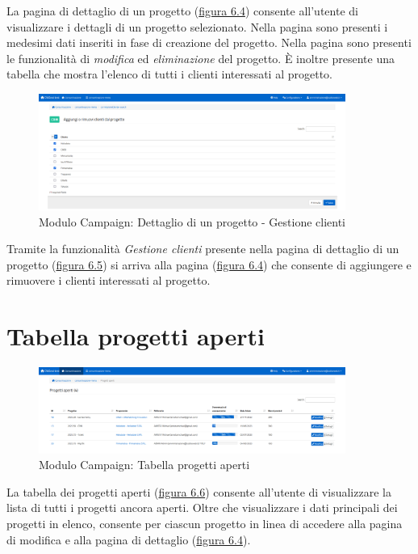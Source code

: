 \noindent La pagina di dettaglio di un progetto ({\hyperref[fig:dettaglioProgetto]{figura 6.4}}) consente all'utente di visualizzare i dettagli di un progetto selezionato. Nella pagina sono presenti i medesimi dati inseriti in fase di creazione del progetto. Nella pagina sono presenti le funzionalità di \textit{modifica} ed \textit{eliminazione} del progetto. È inoltre presente una tabella che mostra l'elenco di tutti i clienti interessati al progetto. 

\begin{figure}[!h]
\centering
\includegraphics[width=380px]{../images/UI/06-aggiungiRimuoviClienti.png}
\caption{Modulo Campaign: Dettaglio di un progetto - Gestione clienti}
\label{fig:gestioneClienti}
\end{figure}

\noindent Tramite la funzionalità \textit{Gestione clienti} presente nella pagina di dettaglio di un progetto ({\hyperref[fig:gestioneClienti]{figura 6.5}}) si arriva alla pagina ({\hyperref[fig:dettaglioProgetto]{figura 6.4}}) che consente di aggiungere e rimuovere i clienti interessati al progetto.

\pagebreak

\section{Tabella progetti aperti}
\begin{figure}[!h]
\centering
\includegraphics[width=380px]{../images/UI/07-tabellaProgettiAperti.png}
\caption{Modulo Campaign: Tabella progetti aperti}
\label{fig:tabellaProgettiAperti}
\end{figure}

\noindent La tabella dei progetti aperti ({\hyperref[fig:tabellaProgettiAperti]{figura 6.6}}) consente all'utente di visualizzare la lista di tutti i progetti ancora aperti. Oltre che visualizzare i dati principali dei progetti in elenco, consente per ciascun progetto in linea di accedere alla pagina di modifica e alla pagina di dettaglio ({\hyperref[fig:dettaglioProgetto]{figura 6.4}}).  

